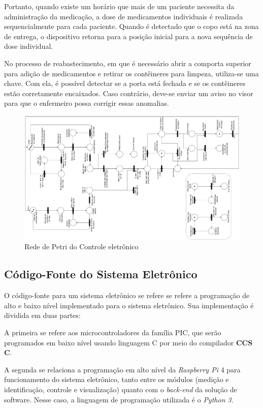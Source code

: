 Portanto, quando existe um horário que mais de um paciente necessita da administração da medicação, a dose de medicamentos individuais é realizada sequencialmente para cada paciente. Quando é detectado que o copo está na zona de entrega, o dispositivo retorna para a posição inicial para a nova sequência de dose individual.

No processo de reabastecimento, em que é necessário abrir a comporta superior para adição de medicamentos e retirar os contêineres para limpeza, utiliza-se uma chave. Com ela, é possível detectar se a porta está fechada e se os contêineres estão corretamente encaixados. Caso contrário, deve-se enviar um aviso no visor para que o enfermeiro possa corrigir essas anomalias. 

\begin{figure}[H]
    \centering
    \includegraphics[width=1.4\textwidth, angle = -90]{figuras/eletronica/fluxogramas/petri.pdf}
    \caption{Rede de Petri do Controle eletrônico}
    \label{fig:rede_petri}
\end{figure}

\subsection{Código-Fonte do Sistema Eletrônico}


O código-fonte para um sistema eletrônico se refere se refere a programação de alto e baixo nível implementado para o sistema eletrônico. Sua implementação é dividida em duas partes: 

A primeira se refere aos microcontroladores da família PIC, que serão programados em baixo nível usando linguagem C por meio do compilador \textbf{CCS C}. 

A segunda se relaciona a programação em alto nível da \textit{Raspberry Pi} 4 para funcionamento do sistema eletrônico, tanto entre os módulos (medição e identificação, controle e visualização) quanto com o \textit{back-end} da solução de software. Nesse caso, a linguagem de programação utilizada é o \textit{Python 3}.

